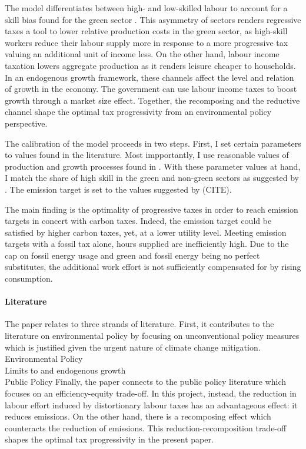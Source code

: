 The model differentiates between high- and low-skilled labour to account for a skill bias found for the green sector \citep{Consoli2016DoCapital}. This asymmetry of sectors renders regressive taxes a tool to lower relative production costs in the green sector, as high-skill workers reduce their labour supply more in response to a more progressive tax valuing an additional unit of income less. %
On the other hand, labour income taxation lowers aggregate production as it renders leisure cheaper to households. 
In an endogenous growth framework, these channels affect the level and relation of growth in the economy. The government can use labour income taxes to boost growth through a market size effect. Together, the recomposing and the reductive channel shape the optimal tax progressivity from an environmental policy perspective. 


The calibration of the model proceeds in two steps. First, I set certain parameters to values found in the literature. Most impportantly, I use reasonable values of production and growth processes found in \cite{Fried2018ClimateAnalysis}. %
With these parameter values at hand, I match the share of high skill in the green and non-green sectors as suggested by \cite{Consoli2016DoCapital}. The emission target is set to the values suggested by (CITE).

The main finding is the optimality of progressive taxes in order to reach emission targets in concert with carbon taxes. Indeed, the emission target could be satisfied by higher carbon taxes, yet, at a lower utility level.  
Meeting emission targets with a fossil tax alone, hours supplied are inefficiently high. Due to the cap on fossil energy usage and green and fossil energy being no perfect substitutes, the additional work effort is not sufficiently compensated for by rising consumption.  


\paragraph{Literature}
The paper relates to three strands of literature. First, it contributes to the literature on environmental policy by focusing on unconventional policy measures which is justified given the urgent nature of climate change mitigation.  
{Environmental Policy}
\\
{Limits to and endogenous growth}
\\{Public Policy}
Finally, the paper connects to the public policy literature which focuses on an efficiency-equity trade-off. In this project, instead, the reduction in labour effort induced by distortionary labour taxes has an advantageous effect: it reduces emissions. On the other hand, there is a recomposing effect which counteracts the reduction of emissions. This reduction-recomposition trade-off shapes the optimal tax progressivity in the present paper. 